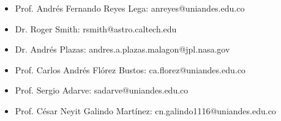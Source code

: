 \documentclass[line,margin]{res}
\begin{document}
\begin{resume}
\begin{itemize}

\item Prof. Andrés Fernando Reyes Lega: anreyes@uniandes.edu.co

\item Dr. Roger Smith: rsmith@astro.caltech.edu 

\item Dr. Andrés Plazas: andres.a.plazas.malagon@jpl.nasa.gov

\item Prof. Carlos Andrés Flórez Bustos: ca.florez@uniandes.edu.co

\item Prof. Sergio Adarve: sadarve@uniandes.edu.co

\item Prof. César Neyit Galindo Martínez: cn.galindo1116@uniandes.edu.co

\end{itemize}
  
\end{resume}
\end{document}
